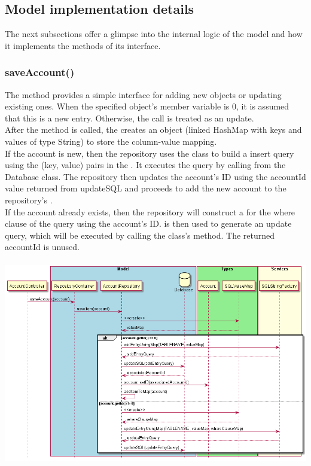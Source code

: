 \documentclass[12pt]{article}
\begin{document}
\subsection{Model implementation details}
The next subsections offer a glimpse into the internal logic of the model and how it implements the methods of its interface.

\subsubsection{saveAccount()} \label{sec:modelSaveDetail}
The  method provides a simple interface for adding new  objects or updating existing ones. When the specified  object's  member variable is 0, it is assumed that this is a new entry. Otherwise, the call is treated as an update. \\ 

After the  method is called, the  creates an  object (linked HashMap with keys and values of type String) to store the column-value mapping. \\

If the account is new, then the repository uses the  class to build a  insert query using the (key, value) pairs in the . It executes the query by calling  from the Database class. The repository then updates the account's ID using the accountId value returned from updateSQL and proceeds to add the new account to the repository's .\\

If the account already exists, then the repository will construct a  for the where clause of the query using the account's ID.  is then used to generate an update query, which will be executed by calling the  class's  method. The returned accountId is unused. \\
\\
\includegraphics[width=\textwidth,height=\textheight,keepaspectratio]{diagrams/sequence/addAccountImp.png}
\bigskip
\end{document}
